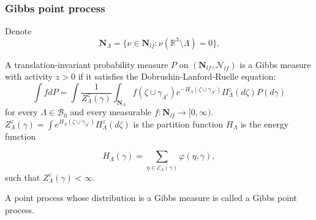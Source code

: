 \documentclass[c, 10pt]{beamer}
\begin{document}
\begin{frame}\frametitle{Gibbs point process}

{\small
Denote
	$$\mathbf N_\Lambda = \{ \nu \in \mathbf N_{lf}: \nu( \mathbb R^3 \setminus \Lambda ) = 0 \}.$$

	A translation-invariant probability measure $P$ on $(\mathbf N_{lf}, \mathcal N_{lf})$ is a \alert{Gibbs measure} with activity $z>0$ if it satisfies the \alert{Dobrushin-Lanford-Ruelle} equation:
	\begin{equation*}
		\int f dP = \int \frac 1 {Z^z_{\Lambda}(\gamma)} \int_{\mathbf N_\Lambda} f(\zeta \cup \gamma_{\Lambda^c}) e^{-H_{\Lambda}(\zeta \cup \gamma_{\Lambda^c})} \Pi^z_\Lambda (d\zeta) P(d\gamma)
	\end{equation*}
	for every $\Lambda \in \mathcal B_0$ and every measurable $f:\mathbf N_{lf} \to [0,\infty)$. \newline 
	$Z^z_{\Lambda}(\gamma) = \int e^{H_\Lambda (\zeta \cup \gamma_{\Lambda^c})} \Pi^z_\Lambda(d\zeta)$ is the \alert{partition function} \newline
	$H_{\Lambda}$ is the \alert{energy function} 
	
	$$H_{\Lambda}(\gamma) = \sum_{\eta \in \mathcal E_\Lambda(\gamma)} \varphi(\eta, \gamma),$$
	such that $Z^z_\Lambda(\gamma) < \infty$. \newline

		A point process whose distribution is a Gibbs measure is called a \alert{Gibbs point process}.

	}



\end{frame}
\end{document}
